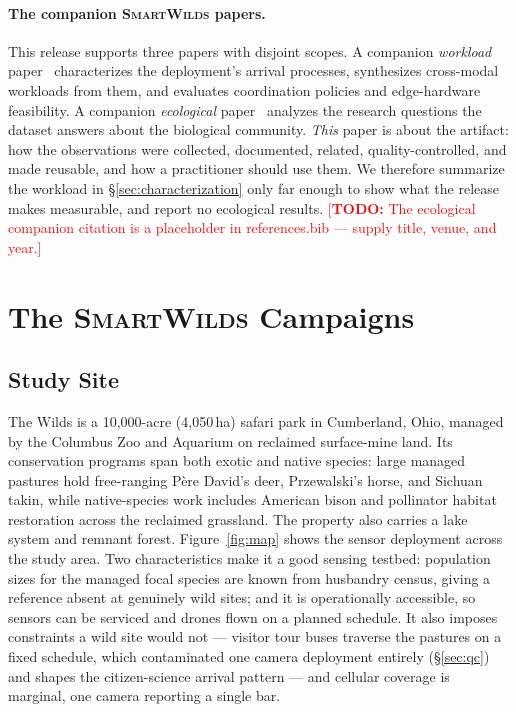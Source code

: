 \documentclass[sigconf]{acmart}
\newcommand{\smartwilds}{\textsc{SmartWilds}\xspace}
\newcommand{\TODO}[1]{\textcolor{red}{\footnotesize[\textbf{TODO:} #1]}}
\newcommand{\TODO}[1]{}
\begin{document}
\paragraph{The companion \smartwilds papers.}
This release supports three papers with disjoint scopes. A companion
\emph{workload} paper~\cite{kline2026blueprint} characterizes the
deployment's arrival processes, synthesizes cross-modal workloads from
them, and evaluates coordination policies and edge-hardware
feasibility. A companion
\emph{ecological} paper~\cite{smartwilds_ecology} analyzes the research
questions the dataset answers about the biological community.
\emph{This} paper is about the artifact: how the observations were
collected, documented, related, quality-controlled, and made reusable,
and how a practitioner should use them. We therefore summarize the
workload in \S\ref{sec:characterization} only far enough to show what
the release makes measurable, and report no ecological results.
\TODO{The ecological companion citation is a placeholder in
references.bib --- supply title, venue, and year.}

\section{The \smartwilds Campaigns}
\label{sec:campaign}

\subsection{Study Site}

The Wilds is a 10{,}000-acre (4{,}050\,ha) safari park in Cumberland,
Ohio, managed by the Columbus Zoo and Aquarium on reclaimed
surface-mine land. Its conservation programs span both exotic and
native species: large managed pastures hold free-ranging Père David's
deer, Przewalski's horse, and Sichuan takin, while native-species work
includes American bison and pollinator habitat restoration across the
reclaimed grassland. The property also carries a lake system and
remnant forest. Figure~\ref{fig:map} shows the sensor deployment across
the study area. Two characteristics make it a good sensing testbed:
population sizes for the managed focal species are known from husbandry
census, giving a reference absent at genuinely wild sites; and it is
operationally accessible, so sensors can be serviced and drones flown
on a planned schedule. It also imposes constraints a wild site would not --- visitor
tour buses traverse the pastures on a fixed schedule, which contaminated
one camera deployment entirely (\S\ref{sec:qc}) and shapes the
citizen-science arrival pattern --- and cellular coverage is marginal,
one camera reporting a single bar.
\end{document}
